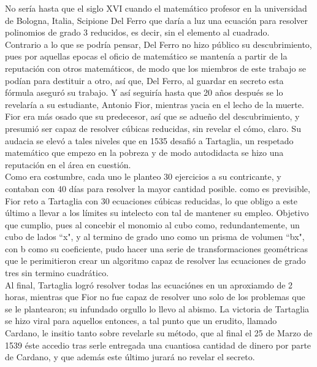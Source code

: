 \documentclass[12pt,letterpaper]{article}
\begin{document}
\noindent No sería hasta que el siglo XVI cuando el matemático profesor en la universidad de Bologna, Italia, Scipione Del Ferro que daría a luz una ecuación para resolver polinomios de grado 3 reducidos, es decir, sin el elemento al cuadrado.
\\

\noindent Contrario a lo que se podría pensar, Del Ferro no hizo público su descubrimiento, pues por aquellas epocas el oficio de matemático se mantenía a partir de la reputación con otros matemáticos, de modo que los miembros de este trabajo se podían para destituir a otro, así que, Del Ferro, al guardar en secreto esta fórmula aseguró su trabajo. Y así seguiría hasta que 20 años después se lo revelaría a su estudiante, Antonio Fior, mientras yacia en el lecho de la muerte.
\\

\noindent Fior era más osado que su predecesor, así que se adueño del descubrimiento, y presumió ser capaz de resolver cúbicas reducidas, sin revelar el cómo, claro. Su audacia se elevó a tales niveles que en 1535 desafió a Tartaglia, un respetado matemático que empezo en la pobreza y de modo autodidacta se hizo una reputación en el área en cuestión.
\\

\noindent Como era costumbre, cada uno le planteo 30 ejercicios a su contricante, y contaban con 40 días para resolver la mayor cantidad posible. como es previsible, Fior reto a Tartaglia con 30 ecuaciones cúbicas reducidas, lo que obligo a este último a llevar a los límites su intelecto con tal de mantener su empleo. Objetivo que cumplio, pues al concebir el monomio al cubo como, redundantemente, un cubo de lados ``x", y al termino de grado uno como un prisma de volumen ``bx", con b como su coeficiente, pudo hacer una serie de transformaciones geométricas que le perimitieron crear un algoritmo capaz de resolver las ecuaciones de grado tres sin termino cuadrático.
\\

\noindent Al final, Tartaglia logró resolver todas las ecuaciónes en un aproxiamdo de 2 horas, mientras que Fior no fue capaz de resolver uno solo de los problemas que se le plantearon; su infundado orgullo lo llevo al abismo. La victoria de Tartaglia se hizo viral para aquellos entonces, a tal punto que un erudito, llamado Cardano, le insitio tanto sobre revelarle su método, que al final el 25 de Marzo de 1539 éste accedio tras serle entregada una cuantiosa cantidad de dinero por parte de Cardano, y que además este último jurará no revelar el secreto.
\\
\end{document}
